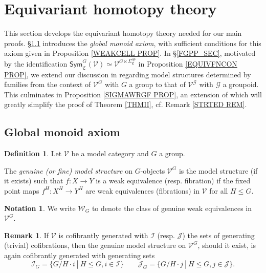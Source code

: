 \documentclass[a4paper,10pt
,draft
]{article}%
\numberwithin{equation}{section}
\numberwithin{figure}{section}
\theoremstyle{definition} %
\newtheorem{definition}[equation]{Definition}%
\newtheorem{remark}[equation]{Remark}%
\newtheorem{notation}[equation]{Notation}%
\newcommand{\V}{\ensuremath{\mathcal V}}
\newcommand{\G}{\ensuremath{\mathcal G}}
\newcommand{\1}{\ensuremath{\mathbbm 1}}%
\begin{document}
\section{Equivariant homotopy theory}
\label{EHT_SEC}

This section develops the 
equivariant homotopy theory 
needed for our main proofs.
\S \ref{GMA_SEC} introduces the \emph{global monoid axiom}, 
with sufficient conditions for this axiom given in 
Proposition \ref{WEAKCELL PROP}.
In \S \ref{FGPP_SEC},
motivated by the identification
$\mathsf{Sym}^{G}_{\mathfrak{C}}(\V)
\simeq \V^{G \ltimes \Sigma^{op}_{\mathfrak{C}}}$
in Proposition \ref{EQUIVFNCON PROP}, 
we extend our discussion 
in \cite[\S 6]{BP_geo}
regarding model structures determined by families
from the context of $\V^G$ with $G$ a group to that of
$\V^{\G}$ with $\G$ a groupoid.
This culminates in Proposition \ref{SIGMAWRGF PROP}, an extension of \cite[Prop. 6.25]{BP_geo}
which will greatly simplify the proof of Theorem \ref{THMII},
cf. Remark \ref{STRTED REM}.


\subsection{Global monoid axiom}
\label{GMA_SEC}



\begin{definition}\label{GENMOD DEF}
	Let $\V$ be a model category and $G$ a group.
	
	The \emph{genuine (or fine) model structure} on $G$-objects $\V^G$
	is the model structure (if it exists)
	such that
	$f\colon X \to Y$
	is a weak equivalence (resp. fibration)
	if the fixed point maps
	$f^H\colon X^H \to Y^H$
	are weak equivalences (fibrations) in $\V$
	for all $H \leq G$.
\end{definition}


\begin{notation}
	We write $\mathcal{W}_G$
	to denote the class of genuine weak equivalences in $\V^G$.
\end{notation}


\begin{remark}
	If $\V$ is cofibrantly generated with 
	$\mathcal{I}$ (resp. $\mathcal{J}$)
	the sets of generating (trivial) cofibrations,
	then the genuine model structure on $\V^G$,
	should it exist,
	is again cofibrantly generated with generating sets
	\begin{equation}\label{GENGENSETEQ}
	\mathcal{I}_G = \{G/H \cdot i \ | \ H\leq G,i\in \mathcal{I}\}
	\qquad
	\mathcal{J}_G = \{G/H \cdot j \ | \ H\leq G,j\in \mathcal{J}\}.
	\end{equation}
\end{remark}
\end{document}
